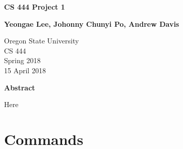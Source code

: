 \documentclass[10pt, letterpaper]{article}
\begin{document}
\begin{titlepage}

    \begin{center}
        \vspace*{5cm}
        
        \textbf{CS 444 Project 1}

        \vspace{1.5cm}

        \textbf{Yeongae Lee, Johonny Chunyi Po, Andrew Davis}

        \vspace{0.8cm}

        Oregon State University\\
        CS 444\\
        Spring 2018\\
        15 April 2018\\

        \vspace{0.8cm}

        \textbf{Abstract}\\

        \vspace{0.5cm}

        Here

        \vfill
    \end{center}
\end{titlepage}

\newpage


\section{Commands}
\end{document}

